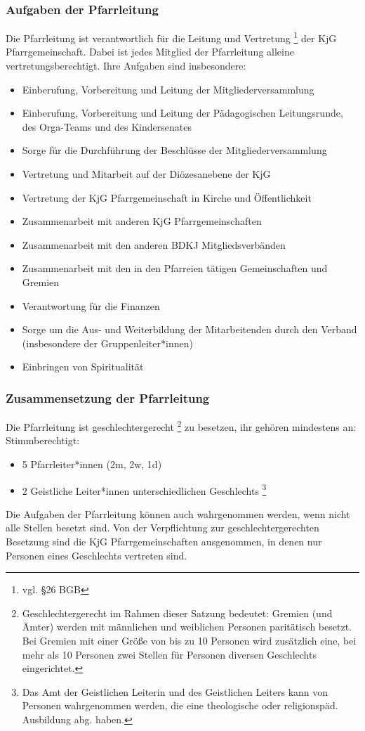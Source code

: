 \documentclass[12pt]{report}
\newcommand{\footnoteremember}[2]{
  \footnote{#2}
  \newcounter{#1}
  \setcounter{#1}{\value{footnote}}
}
\begin{document}
\begin{flushleft}
\subsubsection{Aufgaben der Pfarrleitung}
Die Pfarrleitung ist verantwortlich für die Leitung und Vertretung \footnote{ vgl. §26 BGB} der KjG Pfarrgemeinschaft.
Dabei ist jedes Mitglied der Pfarrleitung alleine vertretungsberechtigt.
Ihre Aufgaben sind insbesondere:
\begin{itemize}
  \item Einberufung, Vorbereitung und Leitung der Mitgliederversammlung
  \item Einberufung, Vorbereitung und Leitung der Pädagogischen Leitungsrunde, des Orga-Teams und des Kindersenates
  \item Sorge für die Durchführung der Beschlüsse der Mitgliederversammlung
  \item Vertretung und Mitarbeit auf der Diözesanebene der KjG
  \item Vertretung der KjG Pfarrgemeinschaft in Kirche und Öffentlichkeit
  \item Zusammenarbeit mit anderen KjG Pfarrgemeinschaften
  \item Zusammenarbeit mit den anderen BDKJ Mitgliedsverbänden
  \item Zusammenarbeit mit den in den Pfarreien tätigen Gemeinschaften und Gremien
  \item Verantwortung für die Finanzen
  \item Sorge um die Aus- und Weiterbildung der Mitarbeitenden durch den Verband (insbesondere der Gruppenleiter*innen)
  \item Einbringen von Spiritualität
\end{itemize}

\subsubsection{Zusammensetzung der Pfarrleitung}

Die Pfarrleitung ist {\color{red} geschlechtergerecht\footnoteremember{geschlechtergerecht}{Geschlechtergerecht im Rahmen dieser Satzung bedeutet: Gremien (und Ämter) werden mit männlichen und
weiblichen Personen paritätisch besetzt. Bei Gremien mit einer Größe von bis zu 10 Personen wird zusätzlich
eine, bei mehr als 10 Personen zwei Stellen für Personen diversen Geschlechts eingerichtet.}} zu besetzen, ihr gehören mindestens an:
Stimmberechtigt:
\begin{itemize}
  \item 5 Pfarrleiter*innen (2m, 2w, 1d)
  \item {\color{red}2 Geistliche Leiter*innen unterschiedlichen Geschlechts\footnoteremember{Berechtigung Geist}{
    Das Amt der Geistlichen Leiterin und des Geistlichen Leiters kann von Personen wahrgenommen werden,
    die eine theologische oder religionspäd. Ausbildung abg. haben.
  }}
\end{itemize}
Die Aufgaben der Pfarrleitung können auch wahrgenommen werden, wenn nicht alle Stellen besetzt sind.
{\color{red} Von der Verpflichtung zur geschlechtergerechten Besetzung sind die KjG Pfarrgemeinschaften ausgenommen, in
denen nur Personen eines Geschlechts vertreten sind.}


\end{flushleft}
\end{document}
